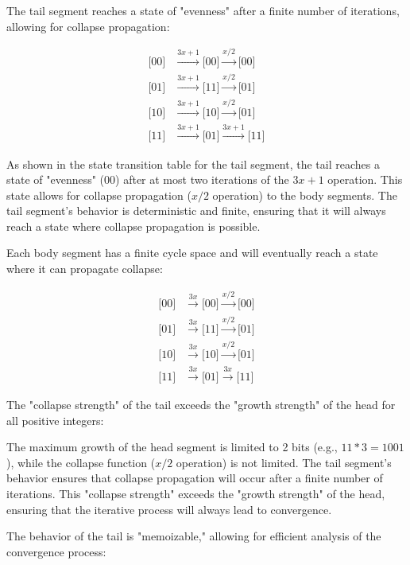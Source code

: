 \documentclass{article}
\begin{document}
The tail segment reaches a state of "evenness" after a finite number of iterations, allowing for collapse propagation:

\begin{align*}
\text{[00]} &\xrightarrow{3x+1} \text{[00]} \xrightarrow{x/2} \text{[00]} \\
\text{[01]} &\xrightarrow{3x+1} \text{[11]} \xrightarrow{x/2} \text{[01]} \\
\text{[10]} &\xrightarrow{3x+1} \text{[10]} \xrightarrow{x/2} \text{[01]} \\
\text{[11]} &\xrightarrow{3x+1} \text{[01]} \xrightarrow{3x+1} \text{[11]}
\end{align*}

As shown in the state transition table for the tail segment, the tail reaches a state of "evenness" (00) after at most two iterations of the $3x + 1$ operation. This state allows for collapse propagation ($x/2$ operation) to the body segments. The tail segment's behavior is deterministic and finite, ensuring that it will always reach a state where collapse propagation is possible.

Each body segment has a finite cycle space and will eventually reach a state where it can propagate collapse:

\begin{align*}
\text{[00]} &\xrightarrow{3x} \text{[00]} \xrightarrow{x/2} \text{[00]} \\
\text{[01]} &\xrightarrow{3x} \text{[11]} \xrightarrow{x/2} \text{[01]} \\
\text{[10]} &\xrightarrow{3x} \text{[10]} \xrightarrow{x/2} \text{[01]} \\
\text{[11]} &\xrightarrow{3x} \text{[01]} \xrightarrow{3x} \text{[11]}
\end{align*}

The "collapse strength" of the tail exceeds the "growth strength" of the head for all positive integers:

The maximum growth of the head segment is limited to 2 bits (e.g., $11 * 3 = 1001$), while the collapse function ($x/2$ operation) is not limited. The tail segment's behavior ensures that collapse propagation will occur after a finite number of iterations. This "collapse strength" exceeds the "growth strength" of the head, ensuring that the iterative process will always lead to convergence.

The behavior of the tail is "memoizable," allowing for efficient analysis of the convergence process:
\end{document}
